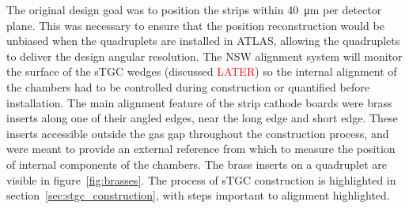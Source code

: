 
The original design goal was to position the strips within \SI{40}{\micro\meter} per detector plane. This was necessary to ensure that the position reconstruction would be unbiased when the quadruplets are installed in ATLAS, allowing the quadruplets to deliver the design angular resolution. The NSW alignment system will monitor the surface of the sTGC wedges (discussed \textcolor{red}{LATER}) so the internal alignment of the chambers had to be controlled during construction or quantified before installation. The main alignment feature of the strip cathode boards were brass inserts along one of their angled edges, near the long edge and short edge. These inserts accessible outside the gas gap throughout the construction process, and were meant to provide an external reference from which to measure the position of internal components of the chambers. The brass inserts on a quadruplet are visible in figure~\ref{fig:brasses}. The process of sTGC construction is highlighted in section~\ref{sec:stgc_construction}, with steps important to alignment highlighted.


